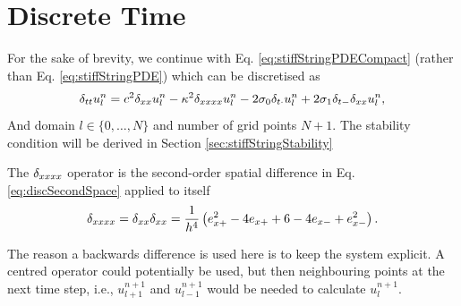 \section{Discrete Time}
For the sake of brevity, we continue with Eq. \eqref{eq:stiffStringPDECompact} (rather than Eq. \eqref{eq:stiffStringPDE}) which can be discretised as 
\begin{equation}\label{eq:stiffStringFDS}
    \delta_{tt} u_l^n = c^2 \delta_{xx} u_l^n - \kappa^2 \delta_{xxxx} u_l^n - 2 \sigma_{0} \delta_{t\cdot} u_l^n + 2 \sigma_{1}\delta_{t-}\delta_{xx} u_l^n,
\end{equation}
And domain $l\in\{0, \hdots, N\}$ and number of grid points $N+1$. The stability condition will be derived in Section \ref{sec:stiffStringStability} 

The $\delta_{xxxx}$ operator is the second-order spatial difference in Eq. \eqref{eq:discSecondSpace} applied to itself
\begin{equation}\label{eq:dxxxx}
    \delta_{xxxx} = \delta_{xx}\delta_{xx} = \frac{1}{h^4}\left(e_{x+}^2 - 4e_{x+}+6 - 4e_{x-}+e_{x-}^2\right).
\end{equation} 

The reason a backwards difference is used here is to keep the system explicit. A centred operator could potentially be used, but then neighbouring points at the next time step, i.e., $u^{n+1}_{l+1}$ and $u^{n+1}_{l-1}$ would be needed to calculate $u^{n+1}_l$. 


